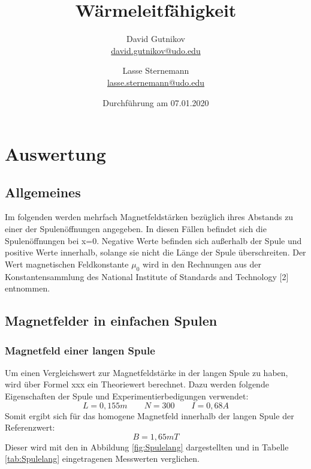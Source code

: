 \documentclass[titlepage = firstcover]{scrartcl}
\title{Wärmeleitfähigkeit}
\author{
  David Gutnikov\\
  \href{mailto:david.gutnikov@udo.edu}{david.gutnikov@udo.edu}
 \and 
  Lasse Sternemann\\
  \href{mailto:lasse.sternemann@udo.edu}{lasse.sternemann@udo.edu}
}
\date{Durchführung am 07.01.2020}
\begin{document}
  \maketitle
  \newpage
  \tableofcontents
  \newpage


\section{Auswertung}
    \subsection{Allgemeines}
        Im folgenden werden mehrfach Magnetfeldstärken bezüglich ihres Abstands zu einer der Spulenöffnungen angegeben. In diesen Fällen befindet sich die 
        Spulenöffnungen bei x=0. Negative Werte befinden sich außerhalb der Spule und positive Werte innerhalb, solange sie nicht die Länge der Spule 
        überschreiten. Der Wert magnetischen Feldkonstante $\mu_0$ wird in den Rechnungen aus der Konstantensammlung des National Institute of Standards 
        and Technology [2] entnommen.
    \subsection{Magnetfelder in einfachen Spulen}
        \subsubsection{Magnetfeld einer langen Spule}
            Um einen Vergleichswert zur Magnetfeldstärke in der langen Spule zu haben, wird über Formel xxx ein Theoriewert berechnet. Dazu werden folgende 
            Eigenschaften der Spule und Experimentierbedigungen verwendet:
            \begin{equation*}  
                L = 0,155m \qquad N = 300 \qquad I = 0,68 A 
            \end{equation*}    
            Somit ergibt sich für das homogene Magnetfeld innerhalb der langen Spule der Referenzwert:
            \begin{equation}
                B = 1,65 mT 
                \label{eqn:BLang}
            \end{equation}
            Dieser wird mit den in Abbildung \ref{fig:Spulelang} dargestellten und in Tabelle \ref{tab:Spulelang} eingetragenen Messwerten verglichen.
\end{document}

